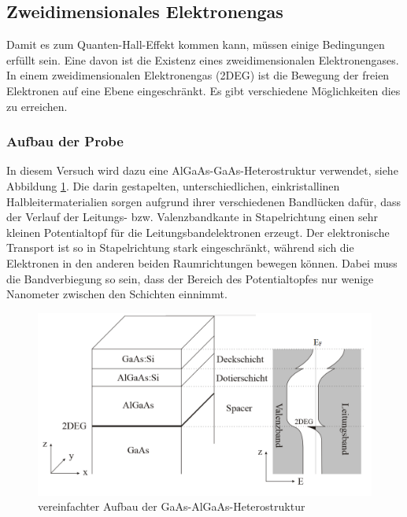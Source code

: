 
\subsection{Zweidimensionales Elektronengas}

Damit es zum Quanten-Hall-Effekt kommen kann, müssen einige Bedingungen erfüllt sein. Eine davon ist die Existenz eines zweidimensionalen Elektronengases.
In einem zweidimensionalen Elektronengas (2DEG) ist die Bewegung der freien Elektronen auf eine Ebene eingeschränkt. Es gibt verschiedene Möglichkeiten dies zu erreichen. 
\subsubsection{Aufbau der Probe}
In diesem Versuch wird dazu eine AlGaAs-GaAs-Heterostruktur verwendet, siehe Abbildung \ref{fig:Proben_Aufbau}. Die darin gestapelten, unterschiedlichen, einkristallinen Halbleitermaterialien sorgen aufgrund ihrer verschiedenen Bandlücken dafür, dass der Verlauf der Leitungs- bzw. Valenzbandkante in Stapelrichtung einen sehr kleinen Potentialtopf für die Leitungsbandelektronen erzeugt. Der elektronische Transport ist so in Stapelrichtung stark eingeschränkt, während sich die Elektronen in den anderen beiden Raumrichtungen bewegen können. Dabei muss die Bandverbiegung so sein, dass der Bereich des Potentialtopfes nur wenige Nanometer zwischen den Schichten einnimmt.

\begin{figure}[h]
\centering
\includegraphics[width=0.7\linewidth]{images/Anleitungsheft/2DEG_Anleitungsheft}
\caption[2DEG Schicht]{vereinfachter Aufbau der GaAs-AlGaAs-Heterostruktur}
\label{fig:Proben_Aufbau}
\end{figure}

